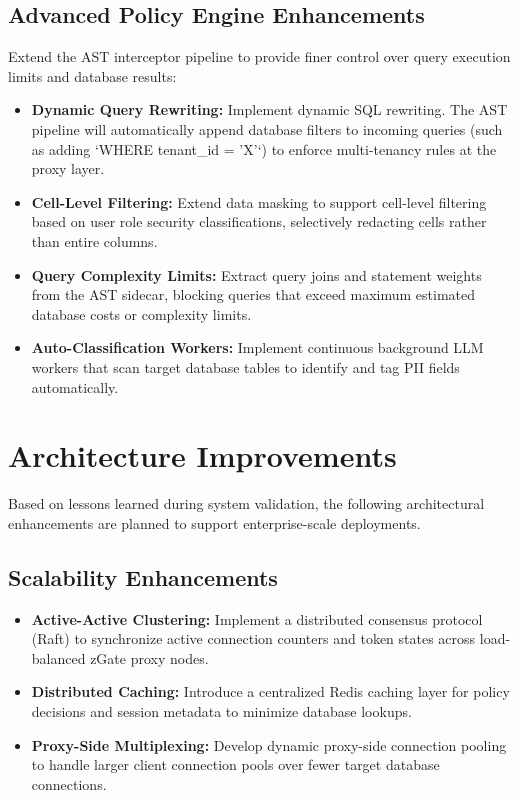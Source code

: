 \subsection{Advanced Policy Engine Enhancements}

Extend the AST interceptor pipeline to provide finer control over query execution limits and database results:
\begin{itemize}
    \item \textbf{Dynamic Query Rewriting:} Implement dynamic SQL rewriting. The AST pipeline will automatically append database filters to incoming queries (such as adding `WHERE tenant\_id = 'X'`) to enforce multi-tenancy rules at the proxy layer.
    \item \textbf{Cell-Level Filtering:} Extend data masking to support cell-level filtering based on user role security classifications, selectively redacting cells rather than entire columns.
    \item \textbf{Query Complexity Limits:} Extract query joins and statement weights from the AST sidecar, blocking queries that exceed maximum estimated database costs or complexity limits.
    \item \textbf{Auto-Classification Workers:} Implement continuous background LLM workers that scan target database tables to identify and tag PII fields automatically.
\end{itemize}


\section{Architecture Improvements}

Based on lessons learned during system validation, the following architectural enhancements are planned to support enterprise-scale deployments.

\subsection{Scalability Enhancements}

\begin{itemize}
    \item \textbf{Active-Active Clustering:} Implement a distributed consensus protocol (Raft) to synchronize active connection counters and token states across load-balanced zGate proxy nodes.
    \item \textbf{Distributed Caching:} Introduce a centralized Redis caching layer for policy decisions and session metadata to minimize database lookups.
    \item \textbf{Proxy-Side Multiplexing:} Develop dynamic proxy-side connection pooling to handle larger client connection pools over fewer target database connections.
\end{itemize}


